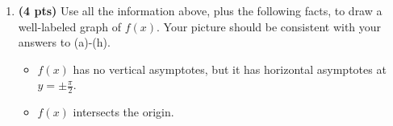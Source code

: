 \documentclass[12pt]{article}
\begin{document}
\begin{enumerate}[1.]
\begin{enumerate}
	\newpage
	
	\vspace{18pc}
	\item {\bf (4 pts)} Use all the information above, plus the following facts, to draw a well-labeled graph of $f(x)$.  Your picture should be consistent with your answers to (a)-(h).
	\begin{itemize}
	\item $f(x)$ has no vertical asymptotes, but it has horizontal asymptotes at $y=\pm\frac{\pi}{2}$.
	\item $f(x)$ intersects the origin.
	\end{itemize}
	\end{enumerate}

\end{enumerate}
\end{document}
